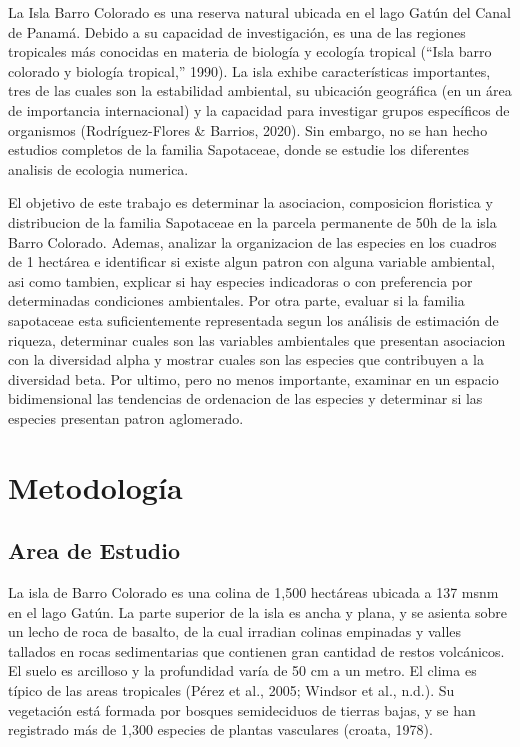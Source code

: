 \documentclass[11pt,]{article}
\begin{document}
La Isla Barro Colorado es una reserva natural ubicada en el lago Gatún
del Canal de Panamá. Debido a su capacidad de investigación, es una de
las regiones tropicales más conocidas en materia de biología y ecología
tropical (``Isla barro colorado y biología tropical,'' 1990). La isla
exhibe características importantes, tres de las cuales son la
estabilidad ambiental, su ubicación geográfica (en un área de
importancia internacional) y la capacidad para investigar grupos
específicos de organismos (Rodríguez-Flores \& Barrios, 2020). Sin
embargo, no se han hecho estudios completos de la familia Sapotaceae,
donde se estudie los diferentes analisis de ecologia numerica.

El objetivo de este trabajo es determinar la asociacion, composicion
floristica y distribucion de la familia Sapotaceae en la parcela
permanente de 50h de la isla Barro Colorado. Ademas, analizar la
organizacion de las especies en los cuadros de 1 hectárea e identificar
si existe algun patron con alguna variable ambiental, asi como tambien,
explicar si hay especies indicadoras o con preferencia por determinadas
condiciones ambientales. Por otra parte, evaluar si la familia
sapotaceae esta suficientemente representada segun los análisis de
estimación de riqueza, determinar cuales son las variables ambientales
que presentan asociacion con la diversidad alpha y mostrar cuales son
las especies que contribuyen a la diversidad beta. Por ultimo, pero no
menos importante, examinar en un espacio bidimensional las tendencias de
ordenacion de las especies y determinar si las especies presentan patron
aglomerado.

\section{Metodología}\label{metodologuxeda}

\subsection{Area de Estudio}\label{area-de-estudio}

La isla de Barro Colorado es una colina de 1,500 hectáreas ubicada a 137
msnm en el lago Gatún. La parte superior de la isla es ancha y plana, y
se asienta sobre un lecho de roca de basalto, de la cual irradian
colinas empinadas y valles tallados en rocas sedimentarias que contienen
gran cantidad de restos volcánicos. El suelo es arcilloso y la
profundidad varía de 50 cm a un metro. El clima es típico de las areas
tropicales (Pérez et al., 2005; Windsor et al., n.d.). Su vegetación
está formada por bosques semideciduos de tierras bajas, y se han
registrado más de 1,300 especies de plantas vasculares (croata, 1978).
\end{document}
